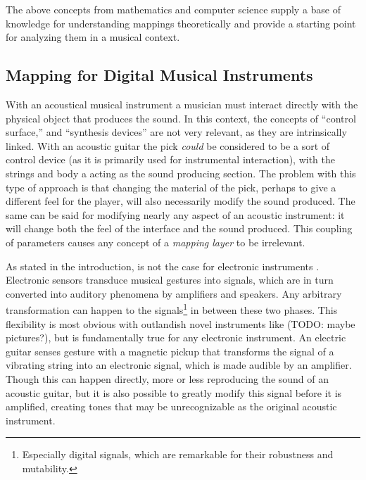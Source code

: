 The above concepts from mathematics and computer science supply a base of knowledge for understanding mappings theoretically and provide a starting point for analyzing them in a musical context.

\subsection{Mapping for Digital Musical Instruments} \label{sec:mappingforDMIs}

With an acoustical musical instrument a musician must interact directly with the physical object that produces the sound. In this context, the concepts of ``control surface,'' and ``synthesis devices'' are not very relevant, as they are intrinsically linked. With an acoustic guitar the pick \emph{could} be considered to be a sort of control device (as it is primarily used for instrumental interaction), with the strings and body a acting as the sound producing section. The problem with this type of approach is that changing the material of the pick, perhaps to give a different feel for the player, will also necessarily modify the sound produced. The same can be said for modifying nearly any aspect of an acoustic instrument: it will change both the feel of the interface and the sound produced. This coupling of parameters causes any concept of a \emph{mapping layer} to be irrelevant.

As stated in the introduction, is not the case for electronic instruments . Electronic sensors transduce musical gestures into signals, which are in turn converted into auditory phenomena by amplifiers and speakers. Any arbitrary transformation can happen to the signals\footnote{Especially digital signals, which are remarkable for their robustness and mutability.} in between these two phases. This flexibility is most obvious with outlandish novel instruments like (TODO: maybe pictures?), but is fundamentally true for any electronic instrument. An electric guitar senses gesture with a magnetic pickup that transforms the signal of a vibrating string into an electronic signal, which is made audible by an amplifier. Though this can happen directly, more or less reproducing the sound of an acoustic guitar, but it is also possible to greatly modify this signal before it is amplified, creating tones that may be unrecognizable as the original acoustic instrument.

